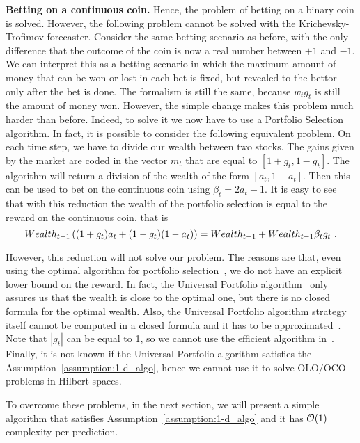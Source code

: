 \textbf{Betting on a continuous coin.}
Hence, the problem of betting on a binary coin is solved. However, the following problem cannot be solved with the Krichevsky-Trofimov forecaster. Consider the same betting scenario as before, with the only difference that the outcome of the coin is now a real number between $+1$ and $-1$. We can interpret this as a betting scenario in which the maximum amount of money that can be won or lost in each bet is fixed, but revealed to the bettor only after the bet is done. The formalism is still the same, because $w_t g_t$ is still the amount of money won. However, the simple change makes this problem much harder than before. Indeed, to solve it we now have to use a Portfolio Selection algorithm. In fact, it is possible to consider the following equivalent problem. On each time step, we have to divide our wealth between two stocks. The gains given by the market are coded in the vector $m_t$ that are equal to $[1+g_t, 1-g_t]$. The algorithm will return a division of the wealth of the form $[a_t, 1-a_t]$. Then this can be used to bet on the continuous coin using $\beta_t=2 a_t-1$.
It is easy to see that with this reduction the wealth of the portfolio selection is equal to the reward on the continuous coin, that is
\[
Wealth_{t-1} \left((1+g_t) a_t+(1-g_t)(1-a_t)\right)=Wealth_{t-1}+Wealth_{t-1} \beta_t g_t~.
\]

However, this reduction will not solve our problem.
The reasons are that, even using the optimal algorithm for portfolio selection~\cite{CoverO96}, we do not have an explicit lower bound on the reward. In fact, the Universal Portfolio algorithm~\cite{CoverO96} only assures us that the wealth is close to the optimal one, but there is no closed formula for the optimal wealth.
Also, the Universal Portfolio algorithm strategy itself cannot be computed in a closed formula and it has to be approximated~\cite{KalaiV03}. Note that $|g_t|$ can be equal to 1, so we cannot use the efficient algorithm in~\cite{HazanAK07}.
Finally, it is not known if the Universal Portfolio algorithm satisfies the Assumption~\ref{assumption:1-d_algo}, hence we cannot use it to solve \ac{OLO}/\ac{OCO} problems in Hilbert spaces.

To overcome these problems, in the next section, we will present a simple algorithm that satisfies Assumption~\ref{assumption:1-d_algo} and it has $\mathcal{O}(1)$ complexity per prediction.
